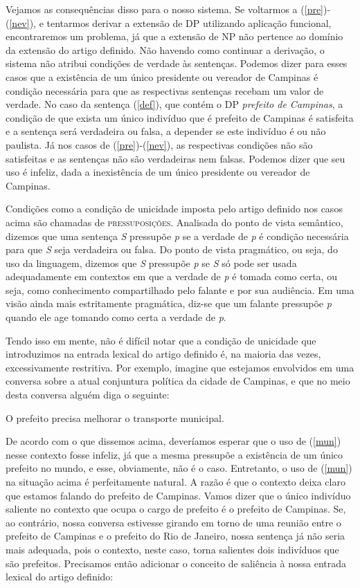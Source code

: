 Vejamos as consequências disso para o nosso sistema. Se voltarmos
a (\ref{pre})-(\ref{nev}), e tentarmos derivar a extensão de DP
utilizando aplicação funcional, encontraremos um problema, já que
a extensão de NP não pertence ao domínio da extensão do artigo
definido. Não havendo como continuar a derivação, o sistema não
atribui condições de verdade às sentenças. Podemos dizer
para esses casos que a existência de um único presidente ou
vereador de Campinas é condição necessária para que as respectivas
sentenças recebam um valor de verdade. No caso da sentença
(\ref{def}), que contém o DP \textit{prefeito de Campinas}, a condição de
que exista um único indivíduo que é prefeito de Campinas é
satisfeita e a sentença será verdadeira ou falsa, a depender se
este indivíduo é ou não paulista. Já nos casos de
(\ref{pre})-(\ref{nev}), as respectivas condições não são
satisfeitas e as sentenças não são verdadeiras nem falsas. Podemos
dizer que seu uso é infeliz, dada a inexistência de um único
presidente ou vereador de Campinas.

Condições como a condição de unicidade imposta pelo artigo
definido nos casos acima são chamadas de \textsc{pressuposições}.
Analisada do ponto de vista semântico, dizemos que uma sentença
\textit{S} pressupõe \textit{p} se a verdade de \textit{p} é
condição necessária para que \textit{S} seja verdadeira ou falsa.
Do ponto de vista pragmático, ou seja, do uso da linguagem,
dizemos que \textit{S} pressupõe \textit{p} se \textit{S} só pode
ser usada adequadamente em contextos em que a verdade de
\textit{p} é tomada como certa, ou seja, como conhecimento compartilhado pelo falante e por sua audiência. Em uma visão ainda mais estritamente pragmática, diz-se que um falante pressupõe \textit{p} quando ele age tomando como certa a verdade de \textit{p}.

Tendo isso em mente, não é difícil notar que a condição de
unicidade que introduzimos na entrada lexical do artigo definido
é, na maioria das vezes, excessivamente restritiva. Por exemplo,
imagine que estejamos envolvidos em uma conversa sobre a atual
conjuntura política da cidade de Campinas, e que no meio desta
conversa alguém diga o seguinte:

\begin{exe}
\ex O prefeito precisa melhorar o transporte municipal.\label{mun}
\end{exe}

\n De acordo com o que dissemos acima, deveríamos esperar que o
uso de (\ref{mun}) nesse contexto fosse infeliz, já que a mesma
pressupõe a existência de um único prefeito no mundo, e esse,
obviamente, não é o caso. Entretanto, o uso de (\ref{mun}) na
situação acima é perfeitamente natural. A razão é que o contexto
deixa claro que estamos falando do prefeito de Campinas. Vamos
dizer que o único indivíduo saliente no contexto que
ocupa o cargo de prefeito é o prefeito de Campinas. Se, ao
contrário, nossa conversa estivesse girando em torno de uma
reunião entre o prefeito de Campinas e o prefeito do Rio de
Janeiro, nossa sentença já não seria mais adequada, pois o
contexto, neste caso, torna salientes dois indivíduos que são
prefeitos. Precisamos então adicionar o conceito de saliência à
nossa entrada lexical do artigo definido:\\

